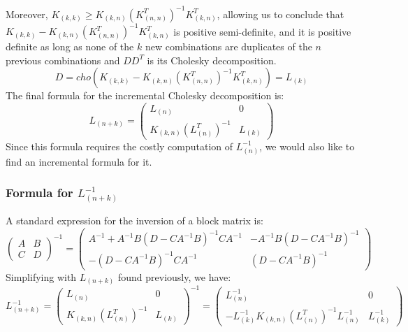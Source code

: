 Moreover, $K_{(k,k)} \geq K_{(k,n)} (K_{(n,n)}^T)^{-1} K_{(k,n)}^T$, allowing us to conclude that $K_{(k,k)} - K_{(k,n)} (K_{(n,n)}^T)^{-1} K_{(k,n)}^T$ is positive semi-definite, and it is positive definite as long as none of the $k$ new combinations are duplicates of the $n$ previous combinations and $D D^T$ is its Cholesky decomposition.
\begin{equation*}
  D = cho(K_{(k,k)} - K_{(k,n)} (K_{(n,n)}^T)^{-1} K_{(k,n)}^T) = L_{(k)}
\end{equation*}
The final formula for the incremental Cholesky decomposition is:
\begin{equation}
  L_{(n+k)} = 
  \begin{pmatrix}
    L_{(n)} & 0 \\
    K_{(k,n)} (L_{(n)}^T)^{-1} & L_{(k)}
  \end{pmatrix}
\end{equation}
Since this formula requires the costly computation of $L_{(n)}^{-1}$, we would also like to find an incremental formula for it.

\subsubsection[Formula for the inverse Cholesky decomposition]{Formula for $L_{(n+k)}^{-1}$}

A standard expression for the inversion of a block matrix is:
\begin{equation*}
  \begin{pmatrix}
    A & B \\
    C & D
  \end{pmatrix}^{-1} = 
  \begin{pmatrix}
    A^{-1} + A^{-1} B (D - C A^{-1} B)^{-1} C A^{-1} & - A^{-1} B (D - C A^{-1} B)^{-1} \\
    - (D - C A^{-1} B)^{-1} C A^{-1} & (D - C A^{-1} B)^{-1}
  \end{pmatrix}
\end{equation*}
Simplifying with $L_{(n+k)}$ found previously, we have:
\begin{equation}
  L_{(n+k)}^{-1} =
  \begin{pmatrix}
    L_{(n)} & 0 \\
    K_{(k,n)} (L_{(n)}^T)^{-1} & L_{(k)}
  \end{pmatrix}^{-1} = 
  \begin{pmatrix}
    L_{(n)}^{-1} & 0 \\
    - L_{(k)}^{-1} K_{(k,n)} (L_{(n)}^T)^{-1} L_{(n)}^{-1} & L_{(k)}^{-1}
  \end{pmatrix}
\end{equation}

